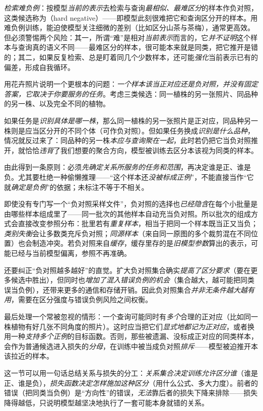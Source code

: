 \emph{检索难负例}：按模型\emph{当前的表示}去检索与查询\emph{最相似、最难区分}的样本作负对照，这类候选称为（hard negative）——即模型此刻很难把它和查询区分开的样本。用难负例训练，能迫使模型关注细微的差别（比如区分山茶与茶梅），通常更高效。但必须警惕两个风险：其一，所谓“难”是相对\emph{当前表示}而言的，它\emph{并不证明}这个样本与查询真的语义不同——最难区分的样本，很可能本来就是同类，把它推开是错的；其二，如果反复检索、总是盯着同几个少数样本，还可能\emph{强化}当前表示已有的偏差，形成自我循环。

用花卉照片说明一个更根本的问题：\emph{一个样本该当正对应还是负对照，并没有固定答案，它取决于你要服务的任务}。考虑三类候选：同一植株的另一张照片、同品种的另一株、以及完全不同的植物。

如果任务是\emph{识别具体是哪一株}，那么同一植株的另一张照片是正对应，同品种另一株则是应当区分开的不同个体（可作负对照）。但如果任务换成\emph{识别是什么品种}，情况就反过来了：同品种的另一株\emph{本应与查询聚在一起}，此时若仍把它当负对照推开，就恰恰\emph{违背}了我们想要的聚合方向，模型被训练去区分本该视为同类的样本。

由此得到一条原则：必须\emph{先确定关系所服务的任务和范围}，再决定谁是正、谁是负。尤其要杜绝一种偷懒推理——“这个样本还\emph{没被标成正例}”，不能直接当作“它就\emph{确定是负例}”的依据；未标注不等于不相关。

即使没有专门写一个“负对照采样文件”，负对照的选择也\emph{已经隐含}在每个小批量是由哪些样本组成里了——同一批次的其他样本自动充当负对照。所以批次的组成方式会直接改变参照分布：批里若有\emph{重复样本}，相当于把同一个样本既当正又当负；\emph{类别失衡}会让多数类充斥负对照；\emph{同源样本}（来自同一原图的多个裁剪混在不同位置）也会制造冲突。若负对照来自\emph{缓存}，缓存里存的是\emph{旧模型参数}算出的表示，可能已经与当前模型偏离，参照不再准确。

还要纠正“负对照越多越好”的直觉。扩大负对照集合确实\emph{提高了区分要求}（要在更多候选中胜出），但同时也\emph{增加了混入错误负例的机会}（集合越大，越可能把同类误当负例），还带来更多的通信和存储开销。因此负对照集合\emph{并非无条件越大越有用}，需要在区分强度与错误负例风险之间权衡。

最后处理一个常被忽视的情形：一个查询可能同时有\emph{多个}合理的正对应（比如同一株植物有好几张不同角度的照片）。这时应当把它们\emph{显式地都记为正对应}，或者换用一种\emph{支持多个正例}的目标函数。否则，那些被遗漏、没标成正对应的同类样本，会作为普通候选进入损失的\emph{分母}，在训练中被当成负对照\emph{排斥}——模型被迫推开本该拉近的样本。

这一节可以用一句话总结关系与损失的分工：\emph{关系集合决定训练允许区分谁}（谁是正、谁是负），\emph{损失函数决定怎样施加这种区分}（用什么公式、多大力度）。前者的错误（把同类当负例）是“方向性”的错误，\emph{无法}靠后者的损失下降来排除——损失降得越低，只说明模型越坚决地执行了一套可能本身就错的关系。

